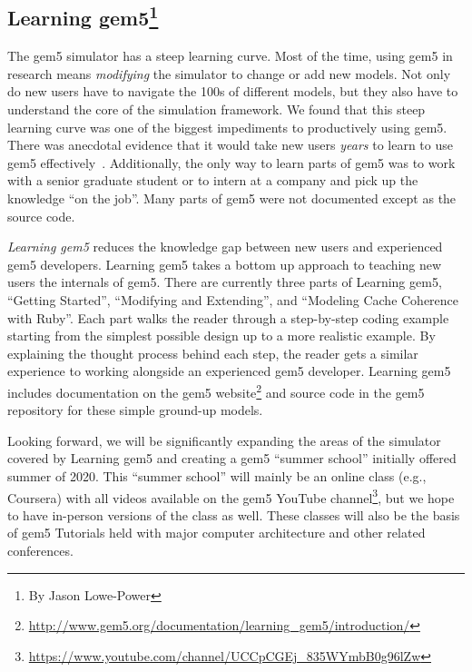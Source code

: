 \subsection[Learning gem5]{Learning gem5\footnote{By Jason Lowe-Power}}

The gem5 simulator has a steep learning curve.
Most of the time, using gem5 in research means \emph{modifying} the simulator to change or add new models.
Not only do new users have to navigate the 100s of different models, but they also have to understand the core of the simulation framework.
We found that this steep learning curve was one of the biggest impediments to productively using gem5.
There was anecdotal evidence that it would take new users \emph{years} to learn to use gem5 effectively~\cite{Power-gem5horrors-2015}.
Additionally, the only way to learn parts of gem5 was to work with a senior graduate student or to intern at a company and pick up the knowledge ``on the job''.
Many parts of gem5 were not documented except as the source code.

\emph{Learning gem5} reduces the knowledge gap between new users and experienced gem5 developers.
Learning gem5 takes a bottom up approach to teaching new users the internals of gem5.
There are currently three parts of Learning gem5, ``Getting Started'', ``Modifying and Extending'', and ``Modeling Cache Coherence with Ruby''.
Each part walks the reader through a step-by-step coding example starting from the simplest possible design up to a more realistic example.
By explaining the thought process behind each step, the reader gets a similar experience to working alongside an experienced gem5 developer.
Learning gem5 includes documentation on the gem5 website\footnote{\url{http://www.gem5.org/documentation/learning_gem5/introduction/}} and source code in the gem5 repository for these simple ground-up models.

Looking forward, we will be significantly expanding the areas of the simulator covered by Learning gem5 and creating a gem5 ``summer school'' initially offered summer of 2020.
This ``summer school'' will mainly be an online class (e.g., Coursera) with all videos available on the gem5 YouTube channel\footnote{\url{https://www.youtube.com/channel/UCCpCGEj_835WYmbB0g96lZw}}, but we hope to have in-person versions of the class as well.
These classes will also be the basis of gem5 Tutorials held with major computer architecture and other related conferences.
